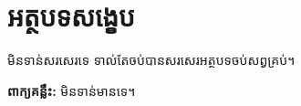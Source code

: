 \clearpage
{}
\chapter*{{\khmoul អត្ថបទសង្ខេប}}

\begin{khmer}

\hs មិនទាន់សរសេរទេ ទាល់តែចប់បានសរសេរអត្ថបទចប់សព្វគ្រប់។

\vspace{0.5cm}
\noindent\textbf{ពាក្យគន្លឹះ:} មិនទាន់មានទេ។

\end{khmer}
